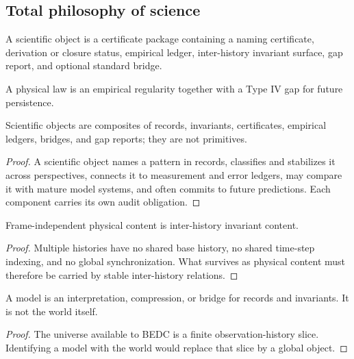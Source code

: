 \subsection{Total philosophy of science}
\label{subsec:philosophy-total-science}

\begin{definition}
\label{def:philosophy-scientific-object-total}
A scientific object is a certificate package containing a naming
certificate, derivation or closure status, empirical ledger,
inter-history invariant surface, gap report, and optional standard
bridge.
\end{definition}

\begin{definition}
\label{def:philosophy-physical-law-total}
A physical law is an empirical regularity together with a Type IV gap
for future persistence.
\end{definition}

\begin{theorem}
\label{thm:philosophy-scientific-object-synthesis-total}
Scientific objects are composites of records, invariants,
certificates, empirical ledgers, bridges, and gap reports; they are not
primitives.
\end{theorem}
\begin{proof}
A scientific object names a pattern in records, classifies and
stabilizes it across perspectives, connects it to measurement and
error ledgers, may compare it with mature model systems, and often
commits to future predictions. Each component carries its own audit
obligation.
\end{proof}

\begin{corollary}
\label{cor:philosophy-relational-physics-principle-total}
Frame-independent physical content is inter-history invariant content.
\end{corollary}
\begin{proof}
Multiple histories have no shared base history, no shared time-step
indexing, and no global synchronization. What survives as physical
content must therefore be carried by stable inter-history relations.
\end{proof}

\begin{corollary}
\label{cor:philosophy-model-not-world-total}
A model is an interpretation, compression, or bridge for records and
invariants. It is not the world itself.
\end{corollary}
\begin{proof}
The universe available to BEDC is a finite observation-history slice.
Identifying a model with the world would replace that slice by a
global object.
\end{proof}

